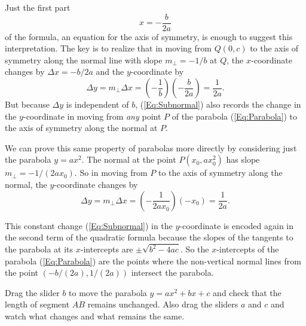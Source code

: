 \documentclass{ximera}
\begin{document}
Just the first part 
\[
    x = -\frac{b}{2a}
\]
of the formula, an equation for the axis of symmetry, is enough to suggest this interpretation. The key is to realize that in moving from $Q(0,c)$ to the axis of symmetry along the normal line with slope $m_\perp = -1/b$ at $Q$, the $x$-coordinate changes by $\Delta x = -b/2a$ and the $y$-coordinate by
\begin{equation}
 \Delta y = m_\perp \Delta x = \left( -\frac{1}{b}\right) \left(- \frac{b}{2a}  \right)= \frac{1}{2a} .  \label{Eq:Subnormal}
\end{equation}
But because $\Delta y$ is independent of $b$, (\ref{Eq:Subnormal}) also records the change in the $y$-coordinate in moving from \emph{any} point $P$ of the parabola (\ref{Eq:Parabola}) to the axis of symmetry along the normal at $P$.

We can prove this same property of parabolas more directly by considering just the parabola $y=ax^2$. The normal at the point $P(x_0, ax_0^2)$ has slope $m_\perp = -1/(2ax_0)$. So in moving from $P$ to the axis of symmetry along the normal, the $y$-coordinate changes by
\[
        \Delta y = m_\perp \Delta x = \left( -\frac{1}{2ax_0}\right) \left(-x_0\right)= \frac{1}{2a}   .
\]

This constant change (\ref{Eq:Subnormal}) in the $y$-coordinate is encoded again in the second term of the quadratic formula because the slopes of the tangents to the parabola at its $x$-intercepts are $\pm \sqrt{b^2-4ac}$. So the $x$-intercepts of the parabola (\ref{Eq:Parabola}) are the points where the non-vertical normal lines from the point $(-b/(2a), 1/(2a))$ intersect the parabola.


\begin{exploration}\label{exp:cq1}
Drag the slider $b$ to move the parabola $y=ax^2 +bx+c$ and check that the length of segment $AB$ remains unchanged. Also drag the sliders $a$ and $c$ and watch what changes and what remains the same.
 
 
\begin{onlineOnly}
    \begin{center}
 
\end{center}
\end{onlineOnly}
\end{exploration}
\end{document}
